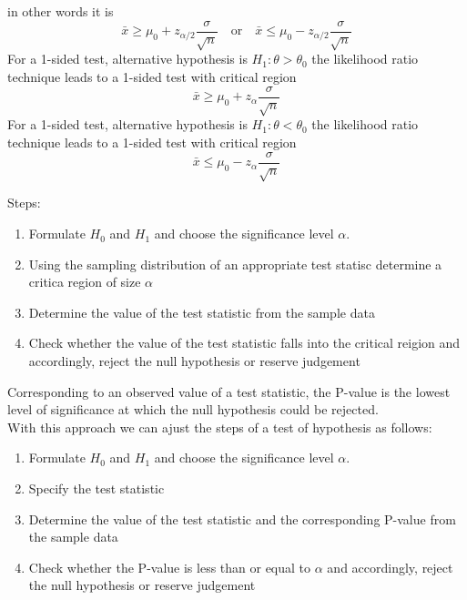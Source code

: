 \documentclass[answers,12pt,addpoints]{exam}
\begin{document}
\begin{definition}
\begin{center}
    \end{center}
    in other words it is 
    $$ \bar{x} \geq \mu_0 + z_{\alpha/2} \frac{\sigma}{\sqrt{n}} \quad \text{or} \quad \bar{x} \leq \mu_0 - z_{\alpha/2} \frac{\sigma}{\sqrt{n}}$$
    For a 1-sided test, alternative hypothesis is $H_1: \theta > \theta_0$ the likelihood ratio technique leads to a 1-sided test with critical region
    $$ \bar{x} \geq \mu_0 + z_{\alpha} \frac{\sigma}{\sqrt{n}}$$
    For a 1-sided test, alternative hypothesis is $H_1: \theta < \theta_0$ the likelihood ratio technique leads to a 1-sided test with critical region
    $$ \bar{x} \leq \mu_0 - z_{\alpha} \frac{\sigma}{\sqrt{n}}$$
\end{definition}
\begin{definition}
    Steps: 
    \begin{enumerate}
        \item Formulate $H_0$ and $H_1$ and choose the significance level $\alpha$.
        \item Using the sampling distribution of an appropriate test statisc determine a critica region of size $\alpha$ 
        \item Determine the value of the test statistic from the sample data
        \item Check whether the value of the test statistic falls into the critical reigion and accordingly, reject the null hypothesis or reserve judgement
    \end{enumerate}
\end{definition}
\begin{definition}[P value]
    Corresponding to an observed value of a test statistic, the P-value is the lowest level of significance at which the null hypothesis could be rejected.\\
    With this approach we can ajust the steps of a test of hypothesis as follows:
    \begin{enumerate}
        \item Formulate $H_0$ and $H_1$ and choose the significance level $\alpha$.
        \item Specify the test statistic 
        \item Determine the value of the test statistic and the corresponding P-value from the sample data
        \item Check whether the P-value is less than or equal to $\alpha$ and accordingly, reject the null hypothesis or reserve judgement
    \end{enumerate}
\end{definition}
\end{document}
